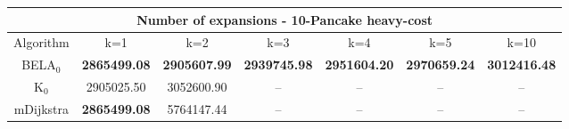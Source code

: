 \begin{tabular}{c|cccccc}\toprule
\multicolumn{7}{c}{Number of expansions - 10-Pancake heavy-cost}\\ \midrule
Algorithm & k=1 & k=2 & k=3 & k=4 & k=5 & k=10 \\ \midrule
BELA$_0$ & \textbf{2865499.08} & \textbf{2905607.99} & \textbf{2939745.98} & \textbf{2951604.20} & \textbf{2970659.24} & \textbf{3012416.48} \\
K$_0$ & 2905025.50 & 3052600.90 & -- & -- & -- & -- \\
mDijkstra & \textbf{2865499.08} & 5764147.44 & -- & -- & -- & -- \\ \bottomrule 
\end{tabular}
